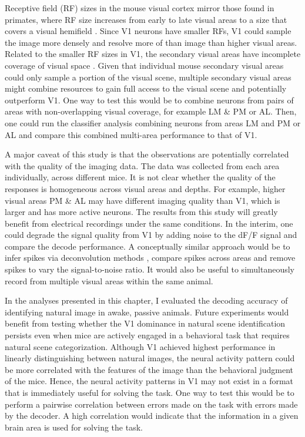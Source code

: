 Receptive field (RF) sizes in the mouse visual cortex mirror those found in primates, where RF size increases from early to late visual areas to a size that covers a visual hemifield \parencite{Wang2007}. Since V1 neurons have smaller RFs, V1 could sample the image more densely and resolve more of than image than higher visual areas. Related to the smaller RF sizes in V1, the secondary visual areas have incomplete coverage of visual space \parencite{Garrett2014,Zhuang2017}. Given that individual mouse secondary visual areas could only sample a portion of the visual scene, multiple secondary visual areas might combine resources to gain full access to the visual scene and potentially outperform V1. One way to test this would be to combine neurons from pairs of areas with non-overlapping visual coverage, for example LM \& PM or AL. Then, one could run the classifier analysis combining neurons from areas LM and PM or AL and compare this combined multi-area performance to that of V1.\par 

A major caveat of this study is that the observations are potentially correlated with the quality of the imaging data. The data was collected from each area individually, across different mice. It is not clear whether the quality of the responses is homogeneous across visual areas and depths. For example, higher visual areas PM \& AL may have different imaging quality than V1, which is larger and has more active neurons. The results from this study will greatly benefit from electrical recordings under the same conditions. In the interim, one could degrade the signal quality from V1 by adding noise to the dF/F signal and compare the decode performance. A conceptually similar approach would be to infer spikes via deconvolution methods \parencite{Vogelstein2010}, compare spikes across areas and remove spikes to vary the signal-to-noise ratio. It would also be useful to simultaneously record from multiple visual areas within the same animal.\par 

In the analyses presented in this chapter, I evaluated the decoding accuracy of identifying natural image in awake, passive animals. Future experiments would benefit from testing whether the V1 dominance in natural scene identification persists even when mice are actively engaged in a behavioral task that requires natural scene categorization. Although V1 achieved highest performance in linearly distinguishing between natural images, the neural activity pattern could be more correlated with the features of the image than the behavioral judgment of the mice. Hence, the neural activity patterns in V1 may not exist in a format that is immediately useful for solving the task. One way to test this would be to perform a pairwise correlation between errors made on the task with errors made by the decoder. A high correlation would indicate that the information in a given brain area is used for solving the task. \par 

